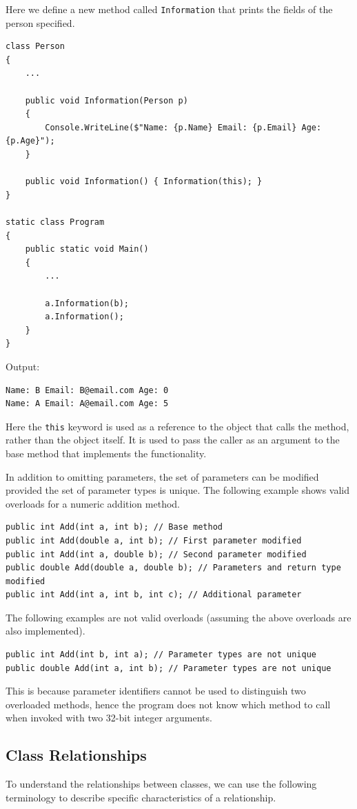 \documentclass{article}
\begin{document}
Here we define a new method called
\lstinline{Information} that prints the fields of the person specified.
\begin{lstlisting}
class Person
{
    ...

    public void Information(Person p)
    {
        Console.WriteLine($"Name: {p.Name} Email: {p.Email} Age: {p.Age}");
    }

    public void Information() { Information(this); }
}

static class Program
{
    public static void Main()
    {
        ...

        a.Information(b);
        a.Information();
    }
}
\end{lstlisting}
Output:
\begin{lstlisting}[numbers=none]
Name: B Email: B@email.com Age: 0
Name: A Email: A@email.com Age: 5
\end{lstlisting}
Here the \lstinline{this} keyword is used as a reference to the object that calls the method, rather than the object itself.
It is used to pass the caller as an argument to the base method that implements the functionality.

In addition to omitting parameters, the set of parameters can be modified provided the set of parameter types
is unique. The following example shows valid overloads for a numeric addition method.
\begin{lstlisting}
public int Add(int a, int b); // Base method
public int Add(double a, int b); // First parameter modified
public int Add(int a, double b); // Second parameter modified
public double Add(double a, double b); // Parameters and return type modified 
public int Add(int a, int b, int c); // Additional parameter
\end{lstlisting}
The following examples are not valid overloads (assuming the above overloads are also implemented).
\begin{lstlisting}
public int Add(int b, int a); // Parameter types are not unique 
public double Add(int a, int b); // Parameter types are not unique 
\end{lstlisting}
This is because parameter identifiers cannot be used to distinguish two overloaded methods,
hence the program does not know which method to call when invoked with two 32-bit integer arguments.
\subsection{Class Relationships}
To understand the relationships between classes, we can use the following terminology to describe specific
characteristics of a relationship.
\end{document}
